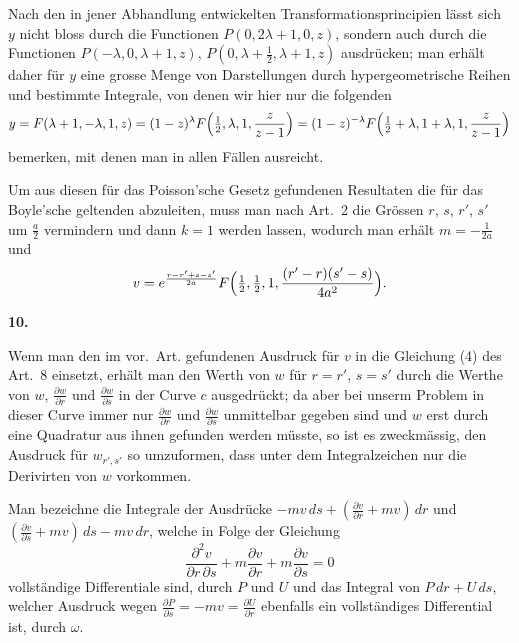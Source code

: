 \documentclass[12pt,a4paper]{article}
\begin{document}
Nach den in jener Abhandlung entwickelten Transformationsprincipien l\"asst sich $y$ nicht bloss durch die Functionen $P(0, 2\lambda+1, 0, z)$, sondern auch durch die Functionen $P(-\lambda, 0, \lambda+1, z)$, $P(0, \lambda+\frac{1}{2}, \lambda+1, z)$ ausdr\"ucken; man erh\"alt daher f\"ur $y$ eine grosse Menge von Darstellungen durch hypergeometrische Reihen und bestimmte Integrale, von denen wir hier nur die folgenden
\[
y = F(\lambda+1, -\lambda, 1, z) = (1-z)^{\lambda}F\Bigl(\tfrac{1}{2}, \lambda, 1, \frac{z}{z-1}\Bigr) = (1-z)^{-\lambda}F\Bigl(\tfrac{1}{2}+\lambda, 1+\lambda, 1, \frac{z}{z-1}\Bigr)
\]
bemerken, mit denen man in allen F\"allen ausreicht.

Um aus diesen f\"ur das Poisson'sche Gesetz gefundenen Resultaten die f\"ur das Boyle'sche geltenden abzuleiten, muss man nach Art.~2 die Gr\"ossen $r$, $s$, $r'$, $s'$ um $\frac{a}{2}$ vermindern und dann $k = 1$ werden lassen, wodurch man erh\"alt $m = -\frac{1}{2a}$ und
\[
v = e^{\frac{r-r'+s-s'}{2a}}F\Bigl(\tfrac{1}{2}, \tfrac{1}{2}, 1, \frac{(r'-r)(s'-s)}{4a^{2}}\Bigr).
\]

\newpage
\begin{center}
\textbf{10.}
\end{center}

Wenn man den im vor.~Art. gefundenen Ausdruck f\"ur $v$ in die Gleichung (4) des Art.~8 einsetzt, erh\"alt man den Werth von $w$ f\"ur $r = r'$, $s = s'$ durch die Werthe von $w$, $\frac{\partial w}{\partial r}$ und $\frac{\partial w}{\partial s}$ in der Curve $c$ ausgedr\"uckt; da aber bei unserm Problem in dieser Curve immer nur $\frac{\partial w}{\partial r}$ und $\frac{\partial w}{\partial s}$ unmittelbar gegeben sind und $w$ erst durch eine Quadratur aus ihnen gefunden werden m\"usste, so ist es zweckm\"assig, den Ausdruck f\"ur $w_{r',s'}$ so umzuformen, dass unter dem Integralzeichen nur die Derivirten von $w$ vorkommen.

Man bezeichne die Integrale der Ausdr\"ucke $-mv\,ds + (\frac{\partial v}{\partial r} + mv)\,dr$ und $(\frac{\partial v}{\partial s} + mv)\,ds - mv\,dr$, welche in Folge der Gleichung
\[
\frac{\partial^{2}v}{\partial r\,\partial s} + m\frac{\partial v}{\partial r} + m\frac{\partial v}{\partial s} = 0
\]
vollst\"andige Differentiale sind, durch $P$ und $U$ und das Integral von $P\,dr + U\,ds$, welcher Ausdruck wegen $\frac{\partial P}{\partial s} = -mv = \frac{\partial U}{\partial r}$ ebenfalls ein vollst\"andiges Differential ist, durch $\omega$.
\end{document}
